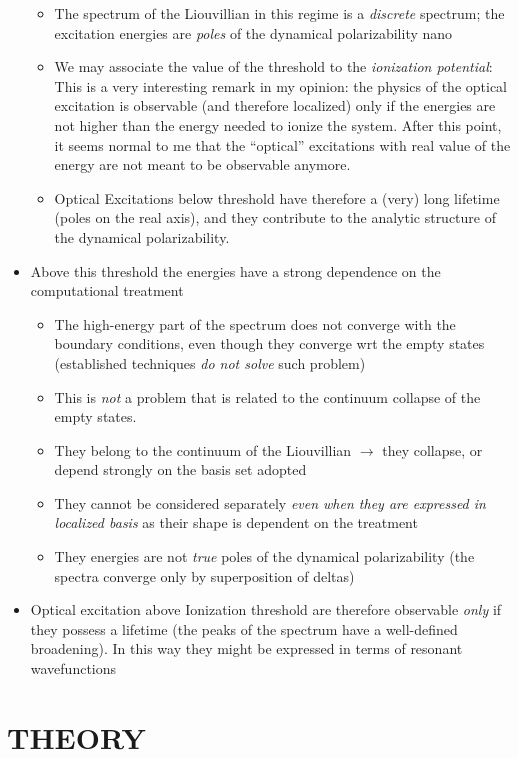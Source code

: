 \documentclass[a4paper]{article}
\begin{document}
\begin{itemize}
\begin{itemize}
\item The spectrum of the Liouvillian in this regime is a \emph{discrete} spectrum; the excitation energies are \emph{poles} of the dynamical polarizability
nano\item We may associate the value of the threshold to the \emph{ionization potential}: This is a very interesting remark in my opinion: the physics of the optical excitation is observable 
(and therefore localized) only if the energies are not higher than the energy needed to ionize the system. After this point, it seems normal to me that the ``optical'' excitations with 
real value of the energy are not  meant to be observable anymore.
\item Optical Excitations below threshold have therefore a (very) long lifetime (poles on the real axis), and they contribute to the analytic structure of the dynamical polarizability.
\end{itemize}
\item Above this threshold the energies have a strong dependence on the computational treatment
\begin{itemize}
\item The high-energy part of the 
spectrum does not converge with the 
boundary conditions, even though they converge wrt the empty states (established techniques \emph{do not solve} such problem)
\item This is \emph{not} a problem that is related to the continuum collapse of the empty states.
\item They belong to the continuum of  the Liouvillian $\rightarrow$ they collapse, or depend strongly on the basis set adopted
\item They cannot be considered separately \emph{even when they are expressed in localized basis} as 
their shape is dependent on the treatment
\item They energies are not \emph{true} poles of the dynamical polarizability (the spectra converge only by superposition of deltas)
\end{itemize}
\item Optical excitation above Ionization threshold are therefore observable \emph{only} if they possess a lifetime (the peaks of the spectrum have a well-defined broadening). 
In this way they might be expressed in terms of resonant wavefunctions
\end{itemize}

\section{THEORY}
\end{document}

